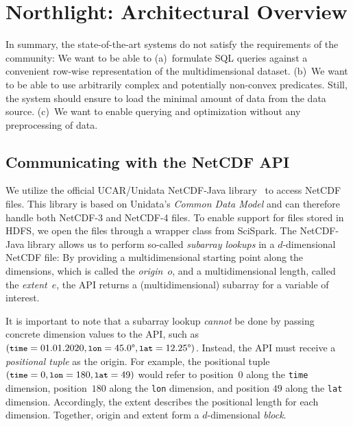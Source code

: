 \documentclass[conference]{IEEEtran}
\newcommand{\system}{Northlight}
\newcommand{\smalltt}[1]{{\texttt{\small #1}}}
\begin{document}
\section{\system{}: Architectural Overview}
\label{sec:architecture}

In summary, the state-of-the-art systems do not satisfy the requirements of the community: We want to be able to (a)~formulate SQL queries against a convenient row-wise representation of the multidimensional dataset. (b)~We want to be able to use arbitrarily complex and potentially non-convex predicates. Still, the system should ensure to load the minimal amount of data from the data source.
(c)~We want to enable querying and optimization without any preprocessing of data. 


\subsection{Communicating with the NetCDF API}
\label{ssec:netcdf_api}

We utilize the official UCAR/Unidata NetCDF-Java library~\cite{lit:netcdf-java} to access NetCDF files. This library is based on Unidata's \textit{Common Data Model}\cite{lit:cdm} and can therefore handle both NetCDF-3 and NetCDF-4 files. To enable support for files stored in HDFS\cite{lit:hadoop-hdfs}, we open the files through a wrapper class\cite{lit:scispark-github} from SciSpark.
The NetCDF-Java library allows us to perform so-called \textit{subarray lookups} in a $d$-dimensional NetCDF file: By providing a multidimensional starting point along the dimensions, which is called the \textit{origin}~$o$, and a multidimensional length, called the \textit{extent}~$e$, the API returns a (multidimensional) subarray for a variable of interest.

It is important to note that a subarray lookup \textit{cannot} be done by passing concrete dimension values to the API, such as $(\smalltt{time}=01.01.2020, \smalltt{lon}=45.0\degree, \smalltt{lat}=12.25\degree)$. Instead, the API must receive a \textit{positional tuple} as the origin. For example, the positional tuple~$(\smalltt{time}=0, \smalltt{lon}=180, \smalltt{lat}=49)$ would refer to position~$0$ along the \smalltt{time} dimension, position~$180$ along the \smalltt{lon} dimension, and position $49$ along the \smalltt{lat} dimension. Accordingly, the extent describes the positional length for each dimension.
Together, origin and extent form a $d$-dimensional \textit{block}.
\end{document}
